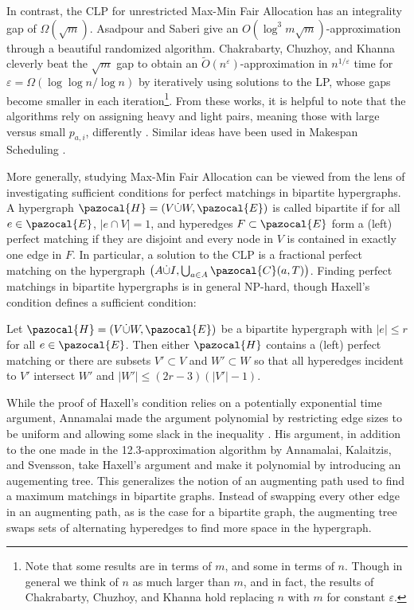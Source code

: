 In contrast, the CLP for unrestricted Max-Min Fair Allocation has an integrality gap of $\Omega(\sqrt{m})$. 
Asadpour and Saberi give an $O(\log^3 m \sqrt{m})$-approximation through a beautiful randomized algorithm. 
Chakrabarty, Chuzhoy, and Khanna cleverly beat the $\sqrt{m}$ gap to obtain an $\tilde{O}(n^{\varepsilon})$-approximation 
in $n^{1/\varepsilon}$ time for $\varepsilon =\Omega \left (  \log \log n / \log n \right )$
by iteratively using solutions to the LP, 
whose gaps become smaller in each iteration\footnote{
Note that some results are in terms of $m$, and some in terms of $n$. Though in general
we think of $n$ as much larger than $m$, and in fact, 
the results of Chakrabarty, Chuzhoy, and Khanna hold replacing $n$ with $m$ for constant $\varepsilon.$
}. 
From these works, it is helpful to note that 
the algorithms rely on assigning heavy and light pairs, meaning those with large versus small $p_{a,i}$,
differently \cite{AlgoForSantaClaus-AnnamalaiKalaitzisSvenssonSODA15,MaxMinFairAllocation-ChakrabartyChuzhoyKhannaFOCS09}. 
Similar ideas have been used in Makespan Scheduling \cite{MakespanScheduling-Svensson-STOC11, SchedulingUnrelatedParallelMachines-LenstraShmoysTardos-FOCS87}.


More generally, studying Max-Min Fair Allocation can be viewed from the lens of investigating sufficient conditions for 
perfect matchings in bipartite hypergraphs. 
A hypergraph $\pazocal{H} = (V \dot\cup W, \pazocal{E})$ is called bipartite if for all
$e \in \pazocal{E}$, $|e \cap V|=1$, and hyperedges $F \subset \pazocal{E}$ form a (left) perfect matching 
if they are disjoint and every node in $V$ is contained in exactly one edge in $F$.
In particular, a solution to the CLP is a fractional perfect matching on the hypergraph 
$ \left(A \dot\cup I, \bigcup_{a \in A}\pazocal{C}(a,T) \right)$.  
Finding perfect matchings in bipartite hypergraphs is in general NP-hard, though
Haxell's condition defines a sufficient condition:
\begin{theorem} \cite{HypergraphMatchingsHaxell95}
Let $\pazocal{H} = (V \dot\cup W, \pazocal{E})$ be a bipartite hypergraph with $|e| \leq r$ for all $e \in \pazocal{E}$.
Then either $\pazocal{H}$ contains a (left) perfect matching or there are subsets $V' \subset V$ and $W' \subset W$
so that all hyperedges incident to $V'$ intersect $W'$ and $|W'| \leq (2r-3)(|V'|-1)$.
\end{theorem}
While the proof of Haxell's condition relies on a potentially exponential time argument, 
Annamalai made the argument polynomial by restricting edge sizes to be uniform and allowing some slack in the inequality \cite{FindingPerfectMatchingsInHypergraphs-Annamalai-SODA16}.
His argument, in addition to the one made in the 12.3-approximation algorithm by Annamalai, Kalaitzis, and Svensson,
take Haxell's argument and make it polynomial by introducing an augementing tree. 
This generalizes the notion of an augmenting path used to find a maximum matchings in bipartite graphs.
Instead of swapping every other edge in an augmenting path, as is the case for a bipartite graph,
the augmenting tree swaps sets of alternating hyperedges to find more space in the hypergraph.








